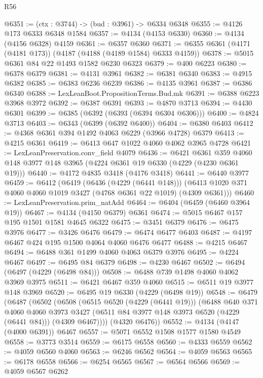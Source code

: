 \begin{lexlean}{R56}
\begin{coremodule}
@6351 := (ctx : @3744) -> (bud : @3961) -> @6334 @6348
@6355 := @4126 @173 @6333 @6348 @1584
@6357 := @4134 (@4153 @6330)
@6360 := @4134 (@4156 @6328) @4159
@6361 := @6357 @6360
@6371 := @6355 @6361 (@4171 (@4181 @173)) (@4187 (@4188 (@4189 @1584) @6333 @4159))
@6378 := @5015 @6361 @84 @22 @1493 @1582 @6230 @6323
@6379 := @400 @6223
@6380 := @6378 @6379
@6381 := @4131 @3961
@6382 := @6381 @6340
@6383 := @4915 @6382
@6385 := @6383 @6236 @6239
@6386 := @4135 @3961
@6387 := @6386 @6340
@6388 := LexLeanBoot.PropositionTerms.Bud.mk
@6391 := @6388 @6223 @3968 @3972
@6392 := @6387 @6391
@6393 := @4870 @3713
@6394 := @4430 @6301
@6399 := @6385 (@6392 (@6393 (@6394 @6304 @6306)))
@6400 := @4824 @3713
@6403 := @6343 (@6399 (@6392 @6400))
@6404 := @6380 @6403
@6412 := @4368 @6361 @394 @1492 @4063 @6229 (@3966 @4728) @6379
@6413 := @4215 @6361
@6419 := @6413 @647 @1022 @4060 @4062 @3965 @4728
@6421 := LexLeanPreservation.conv_field @4079
@6436 := @6421
    @6361
    @359
    @4060
    @148
    @3977
    @148
    @3965
    (@4224 @6361 @19 @6330 (@4229 (@4230 @6361 @19)))
@6440 := @4172 @4835 @3418 (@4176 @3418)
@6441 := @6440 @3977
@6459 := @6412
    (@6419
      (@6436 (@4229 (@6441 @148)))
      (@6413 @1020 @371 @4060 @4060 @1019 @3427 (@4768 @6361 @22 @1019) (@4309 @6361)))
@6460 := LexLeanPreservation.prim_natAdd
@6464 := @6404 (@6459 (@6460 @3964 @19))
@6467 := @4134 (@4150 @6379) @6361
@6474 := @5015 @6467 @157 @195 @1501 @1581 @4645 @6322
@6475 := @3451 @6379
@6476 := @6475 @3976
@6477 := @3426 @6476
@6479 := @6474 @6477 @6403
@6487 := @4197 @6467 @424 @195 @1500 @4064 @4060 @6476 @6477
@6488 := @4215 @6467
@6494 := @6488 @361 @1499 @4060 @4063 @6379 @3976
@6495 := @4224 @6467
@6497 := @6495 @84 @6379
@6498 := @4230 @6467
@6502 := @6494 (@6497 (@4229 (@6498 @84)))
@6508 := @6488 @739 @1498 @4060 @4062 @3969 @3975
@6511 := @6421 @6467 @359 @4060
@6515 := @6511 @19 @3977 @148 @3969
@6520 := @6495 @19 @6330 (@4229 (@6498 @19))
@6548 := @6479
    (@6487
      (@6502
        (@6508
          (@6515 @6520 (@4229 (@6441 @19)))
          (@6488
            @640
            @371
            @4060
            @4060
            @3973
            @3427
            (@6511 @84 @3977 @148 @3973 @6520 (@4229 (@6441 @84)))
            (@4309 @6467))))
      (@4320 @6476))
@6552 := @4134 (@4147 (@4000 @6391)) @6467
@6557 := @5071 @6552 @1508 @1577 @1580 @4549
@6558 := @3773 @3514
@6559 := @6175 @6558
@6560 := @4333 @6559
@6562 := @4059 @6560 @4060
@6563 := @6246 @6562
@6564 := @4059 @6563
@6565 := @6178 @6558
@6566 := @6254 @6565
@6567 := @6564 @6566
@6569 := @4059 @6567 @6262

\end{coremodule}
\end{lexlean}
